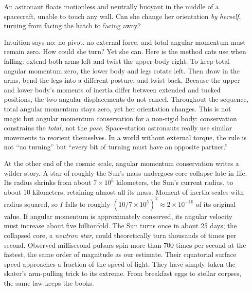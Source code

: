 
\begin{thought}
An astronaut floats motionless and neutrally buoyant in the middle of a spacecraft, unable to touch any wall. Can she change her orientation \emph{by herself}, turning from facing the hatch to facing away?

Intuition says no: no pivot, no external force, and total angular momentum must remain zero. How could she turn? Yet she can. Here is the method cats use when falling: extend both arms left and twist the upper body right. To keep total angular momentum zero, the lower body and legs rotate left. Then draw in the arms, bend the legs into a different posture, and twist back. Because the upper and lower body's moments of inertia differ between extended and tucked positions, the two angular displacements do not cancel. Throughout the sequence, total angular momentum stays zero, yet her orientation changes. This is not magic but angular momentum conservation for a non-rigid body: conservation constrains the \emph{total}, not the \emph{pose}. Space-station astronauts really use similar movements to reorient themselves. In a world without external torque, the rule is not ``no turning'' but ``every bit of turning must have an opposite partner.''
\end{thought}

At the other end of the cosmic scale, angular momentum conservation writes a wilder story. A star of roughly the Sun's mass undergoes core collapse late in life. Its radius shrinks from about \(7\times10^5\) kilometers, the Sun's current radius, to about \(10\) kilometers, retaining almost all its mass. Moment of inertia scales with radius squared, so \(I\) falls to roughly \((10/7\times10^5)^2\approx2\times10^{-10}\) of its original value. If angular momentum is approximately conserved, its angular velocity must increase about five billionfold. The Sun turns once in about 25 days; the collapsed core, a \emph{neutron star}, could theoretically turn thousands of times per second. Observed millisecond pulsars spin more than 700 times per second at the fastest, the same order of magnitude as our estimate. Their equatorial surface speed approaches a fraction of the speed of light. They have simply taken the skater's arm-pulling trick to its extreme. From breakfast eggs to stellar corpses, the same law keeps the books.

